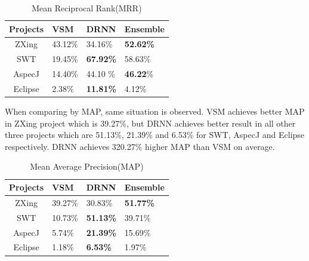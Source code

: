  \begin{table}[h]
 	\begin{center}
 		\caption{Mean Reciprocal Rank(MRR)}
 		\label{performance_MRR}
 		
 		\begin{tabular}{c|l|l|l} %
 			\textbf{Projects} & \textbf{VSM} & \textbf{DRNN} & \textbf{Ensemble} \\
 			\hline\hline
 			ZXing& 43.12\%&34.16\% &\textbf{52.62\%} \\
 			
 			SWT & 19.45\% & \textbf{67.92\%} & 58.63\% \\
 			
 			AspecJ &14.40\%  & 44.10 \% & \textbf{46.22}\%\\
 			
 			Eclipse &2.38\% & \textbf{11.81\%}& 4.12\% \\
 			
 		\end{tabular}
 	\end{center}
 \end{table}


When comparing by MAP, same situation is observed. 
VSM achieves better MAP in ZXing project which is 39.27\%, but DRNN achieves better result in all other three projects which are 51.13\%, 21.39\% and 6.53\% for SWT, AspecJ and Eclipse respectively. 
DRNN achieves 320.27\% higher MAP than VSM on average. 

 \begin{table}[h]
 	\begin{center}
 		\caption{Mean Average Precision(MAP)}
 		\label{performance_map}
 		
 		\begin{tabular}{c|l|l|l} %
 			\textbf{Projects} & \textbf{VSM} & \textbf{DRNN} & \textbf{Ensemble} \\
 			\hline\hline
 			ZXing& 39.27\%&30.83\% &\textbf{51.77\%}\\
 			
 			SWT & 10.73\%  & \textbf{51.13\%}  & 39.71\% \\
 			
 			AspecJ &5.74\% & \textbf{21.39\%} & 15.69\%\\
 			
 			Eclipse &1.18\% & \textbf{6.53\%}& 1.97\% \\
 			
 		\end{tabular}
 	\end{center}
 \end{table}


